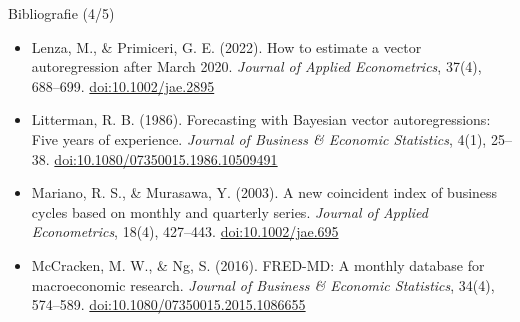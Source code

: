 \begin{frame}{Bibliografie (4/5)}
\begin{itemize}
    \item Lenza, M., \& Primiceri, G. E. (2022). How to estimate a vector autoregression after March 2020. \textit{Journal of Applied Econometrics}, 37(4), 688--699. \href{https://doi.org/10.1002/jae.2895}{doi:10.1002/jae.2895}
    \item Litterman, R. B. (1986). Forecasting with Bayesian vector autoregressions: Five years of experience. \textit{Journal of Business \& Economic Statistics}, 4(1), 25--38. \href{https://doi.org/10.1080/07350015.1986.10509491}{doi:10.1080/07350015.1986.10509491}
    \item Mariano, R. S., \& Murasawa, Y. (2003). A new coincident index of business cycles based on monthly and quarterly series. \textit{Journal of Applied Econometrics}, 18(4), 427--443. \href{https://doi.org/10.1002/jae.695}{doi:10.1002/jae.695}
    \item McCracken, M. W., \& Ng, S. (2016). FRED-MD: A monthly database for macroeconomic research. \textit{Journal of Business \& Economic Statistics}, 34(4), 574--589. \href{https://doi.org/10.1080/07350015.2015.1086655}{doi:10.1080/07350015.2015.1086655}
\end{itemize}
\end{frame}

